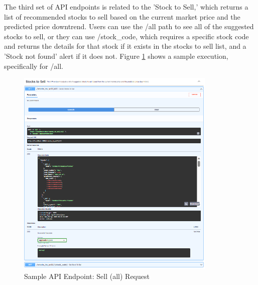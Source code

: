 The third set of API endpoints is related to the 'Stock to Sell,' which returns 
a list of recommended stocks to sell based on the current market price and 
the predicted price downtrend. Users can use the /all path to see all of 
the suggested stocks to sell, or they can use /stock\_code, which requires a 
specific stock code and returns the details for that stock if it exists in the 
stocks to sell list, and a 'Stock not found' alert if it does not. Figure 
\ref{fig:alamAPI_sell} shows a sample execution, specifically for /all.
\begin{figure}[ht]
    \centering
    \includegraphics[width=0.85\textwidth]{./assets/Chapter_4/Documentation/alamAPI_sell.png}
    \caption{Sample API Endpoint: Sell (all) Request}
    \label{fig:alamAPI_sell}
\end{figure}
\FloatBarrier

